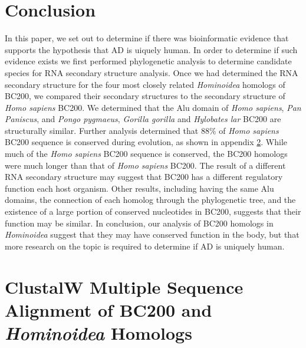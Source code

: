 \documentclass[conference, 11pt]{IEEEtran}
\begin{document}
{\section{Conclusion}\label{sec:conclusion}

In this paper, we set out to determine if there was bioinformatic evidence that supports the hypothesis that AD is uiquely human. 
In order to determine if such evidence exists we first performed phylogenetic analysis to determine candidate species for RNA secondary structure analysis. 
Once we had determined the RNA secondary structure for the four most closely related \emph{Hominoidea} homologs of BC200, we compared their secondary structures to the secondary structure of \emph{Homo sapiens} BC200. 
We determined that the Alu domain of \emph{Homo sapiens}, \emph{Pan Paniscus}, and \emph{Pongo pygmaeus}, \emph{Gorilla gorilla} and \emph{Hylobates lar} BC200 are structurally similar. 
Further analysis determined that 88\% of \emph{Homo sapiens} BC200 sequence is conserved during evolution, as shown in appendix \ref{app:A}. 
While much of the \emph{Homo sapiens} BC200 sequence is conserved, the BC200 homologs were much longer than that of \emph{Homo sapiens} BC200.
The result of a different RNA secondary structure may suggest that BC200 has a different regulatory function each host organism.
Other results, including having the same Alu domains, the connection of each homolog through the phylogenetic tree, and the existence of a large portion of conserved nucleotides in BC200, suggests that their function may be similar. 
In conclusion, our analysis of BC200 homologs in \emph{Hominoidea} suggest that they may have conserved function in the body, but that more research on the topic is required to determine if AD is uniquely human.




\vspace{4cm}

\onecolumn
\appendices

\section{ClustalW Multiple Sequence Alignment of BC200 and \emph{Hominoidea} Homologs}
\label{app:A}

}
\end{document}
